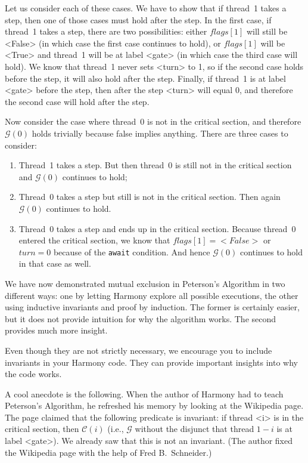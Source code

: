 \documentclass{report}
\begin{document}
Let us consider each of these cases.
We have to show that if thread~1 takes a step, then one of those
cases must hold after the step.
In the first case, if thread~1 takes a step, there are two possibilities:
either $flags[1]$ will still be <{False}> (in which case the first case
continues to hold), or $flags[1]$ will be <{True}>
and thread~1 will be at label <{gate}> (in which case the third case
will hold).
We know that thread~1 never sets <{turn}> to 1, so
if the second case holds before the step, it will also hold after the step.
Finally, if thread~1 is at label <{gate}> before the step, then after
the step <{turn}> will equal 0, and therefore the second case will hold
after the step.

Now consider the case where thread~0 is not in the critical section,
and therefore $\mathcal{G}(0)$ holds trivially because false implies
anything.
There are three cases to consider:
\begin{enumerate}
\item Thread~1 takes a step.  But then thread~0 is still not in the critical
section and $\mathcal{G}(0)$ continues to hold;
\item Thread~0 takes a step but still is not in the critical section.
Then again $\mathcal{G}(0)$ continues to hold.
\item Thread~0 takes a step and ends up in the critical section.
Because thread~0 entered the critical section, we know that
$\mathit{flags}[1] = <{False}>$ or $\mathit{turn} = 0$ because
of the \texttt{await} condition.
And hence $\mathcal{G}(0)$ continues to hold in that case as well.
\end{enumerate}

We have now demonstrated mutual exclusion in Peterson's Algorithm in two
different ways: one by letting Harmony explore all possible executions, the
other using inductive invariants and proof by induction.  The former
is certainly easier, but it does not provide intuition for why the
algorithm works.  The second provides much more insight.

Even though they are not strictly necessary, we encourage you
to include invariants in your Harmony code.
They can provide important insights into why the code works.

A cool anecdote is the following.  When the author of Harmony had to teach
Peterson's Algorithm, he refreshed his memory by looking at the Wikipedia
page.  The page claimed that the following predicate is invariant:
if thread <{i}> is in the critical section, then $\mathcal{C}(i)$ (i.e.,
$\mathcal{G}$ without the disjunct that thread $1-i$ is at label <{gate}>).
We already saw that this is not an invariant.
(The author fixed the Wikipedia page with the help of Fred B.~Schneider.)
\end{document}
